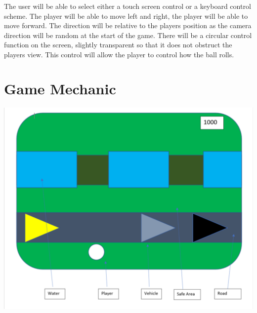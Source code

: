 \documentclass{article}
\begin{document}
The user will be able to select either a touch screen control or a keyboard control scheme. 
The player will be able to move left and right, the player will be able to move forward.
The direction will be relative to the players position as the camera direction will be random at the start of the game.
There will be a circular control function on the screen, slightly transparent so that it does not obstruct the players view.
This control will allow the player to control how the ball rolls.

\section{Game Mechanic}

\begin{minipage}{.9\textwidth}
\includegraphics[width=\linewidth]{ingame}
\end{minipage} \hfill
\end{document}
